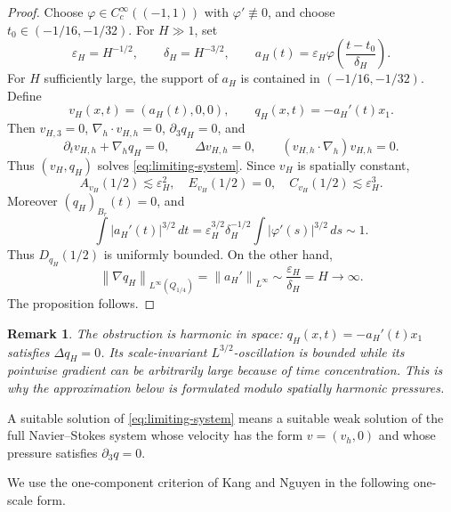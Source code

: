 \documentclass[pdflatex,sn-mathphys-num]{sn-jnl}
\numberwithin{equation}{section}
\theoremstyle{thmstyleone}
\theoremstyle{thmstylethree}
\newtheorem{remark}[theorem]{Remark}
\newcommand{\eps}{\varepsilon}
\newcommand{\dt}{\,dt}
\newcommand{\nabh}{\nabla_h}
\newcommand{\norm}[2]{\left\|#1\right\|_{#2}}
\begin{document}
\begin{proof}
Choose \(\varphi\in C_c^\infty((-1,1))\) with \(\varphi'\not\equiv0\), and choose \(t_0\in(-1/16,-1/32)\).  For \(H\gg1\), set
\[
        \eps_H=H^{-1/2},
        \qquad
        \delta_H=H^{-3/2},
        \qquad
        a_H(t)=\eps_H\varphi\left(\frac{t-t_0}{\delta_H}\right).
\]
For \(H\) sufficiently large, the support of \(a_H\) is contained in \((-1/16,-1/32)\).  Define
\[
        v_H(x,t)=(a_H(t),0,0),
        \qquad
        q_H(x,t)=-a_H'(t)x_1.
\]
Then \(v_{H,3}=0\), \(\nabh\cdot v_{H,h}=0\), \(\partial_3q_H=0\), and
\[
        \partial_t v_{H,h}+\nabh q_H=0,
        \qquad
        \Delta v_{H,h}=0,
        \qquad
        (v_{H,h}\cdot\nabh)v_{H,h}=0.
\]
Thus \((v_H,q_H)\) solves \eqref{eq:limiting-system}.  Since \(v_H\) is spatially constant,
\[
        A_{v_H}(1/2)\lesssim\eps_H^2,
        \quad
        E_{v_H}(1/2)=0,
        \quad
        C_{v_H}(1/2)\lesssim\eps_H^3.
\]
Moreover \((q_H)_{B_r}(t)=0\), and
\[
        \int |a_H'(t)|^{3/2}\dt
        =\eps_H^{3/2}\delta_H^{-1/2}\int |\varphi'(s)|^{3/2}\,ds
        \sim 1.
\]
Thus \(D_{q_H}(1/2)\) is uniformly bounded.  On the other hand,
\[
        \norm{\nabla q_H}{L^\infty(Q_{1/4})}
        =\norm{a_H'}{L^\infty}
        \sim \frac{\eps_H}{\delta_H}=H\to\infty.
\]
The proposition follows.
\end{proof}

\begin{remark}
The obstruction is harmonic in space: \(q_H(x,t)=-a_H'(t)x_1\) satisfies \(\Delta q_H=0\).  Its scale-invariant \(L^{3/2}\)-oscillation is bounded while its pointwise gradient can be arbitrarily large because of time concentration.  This is why the approximation below is formulated modulo spatially harmonic pressures.
\end{remark}

A suitable solution of \eqref{eq:limiting-system} means a suitable weak solution of the full Navier--Stokes system whose velocity has the form \(v=(v_h,0)\) and whose pressure satisfies \(\partial_3q=0\).

We use the one-component criterion of Kang and Nguyen \cite{KangNguyen2023} in the following one-scale form.
\end{document}
